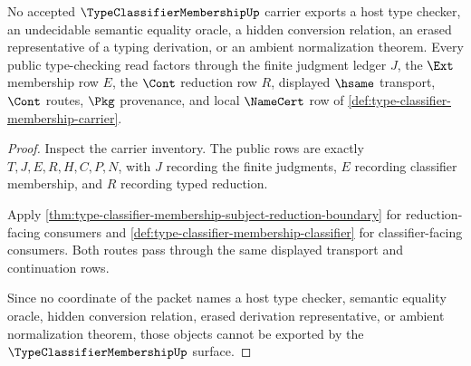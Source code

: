 \begin{theorem}
\label{thm:type-classifier-membership-non-escape}
No accepted $\TypeClassifierMembershipUp$ carrier exports a host type checker, an undecidable semantic equality oracle, a hidden conversion relation, an erased representative of a typing derivation, or an ambient normalization theorem. Every public type-checking read factors through the finite judgment ledger $J$, the $\Ext$ membership row $E$, the $\Cont$ reduction row $R$, displayed $\hsame$ transport, $\Cont$ routes, $\Pkg$ provenance, and local $\NameCert$ row of \autoref{def:type-classifier-membership-carrier}.
\end{theorem}
\begin{proof}
Inspect the carrier inventory. The public rows are exactly $T,J,E,R,H,C,P,N$, with $J$ recording the finite judgments, $E$ recording classifier membership, and $R$ recording typed reduction.

Apply \autoref{thm:type-classifier-membership-subject-reduction-boundary} for reduction-facing consumers and \autoref{def:type-classifier-membership-classifier} for classifier-facing consumers. Both routes pass through the same displayed transport and continuation rows.

Since no coordinate of the packet names a host type checker, semantic equality oracle, hidden conversion relation, erased derivation representative, or ambient normalization theorem, those objects cannot be exported by the $\TypeClassifierMembershipUp$ surface.
\end{proof}

